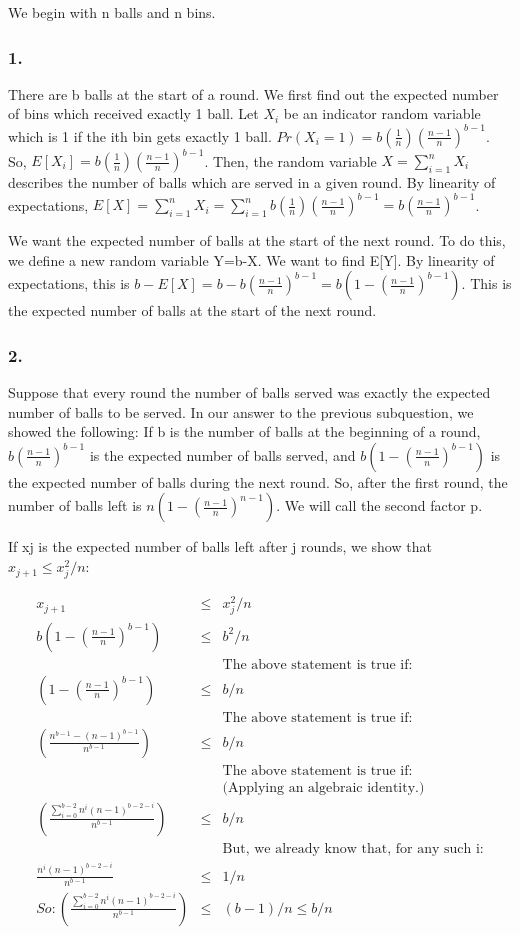 \documentclass[10pt]{article}
\begin{document}
We begin with n balls and n bins.

\subsubsection{1.}
There are b balls at the start of a round. We first find out the expected number of bins which received exactly 1 ball. Let $X_{i}$ be an indicator random variable which is 1 if the ith bin gets exactly 1 ball. $Pr(X_{i}=1)=b(\frac{1}{n})(\frac{n-1}{n})^{b-1}$. So, $E[X_{i}]=b(\frac{1}{n})(\frac{n-1}{n})^{b-1}$. Then, the random variable $X=\sum_{i=1}^{n} X_{i}$ describes the number of balls which are served in a given round. By linearity of expectations, $E[X]=\sum_{i=1}^{n}X_{i}=\sum_{i=1}^{n}b(\frac{1}{n})(\frac{n-1}{n})^{b-1}=b(\frac{n-1}{n})^{b-1}$.

We want the expected number of balls at the start of the next round. To do this, we define a new random variable Y=b-X. We want to find E[Y]. By linearity of expectations, this is $b-E[X] = b-b(\frac{n-1}{n})^{b-1}=b(1-(\frac{n-1}{n})^{b-1})$. This is the expected number of balls at the start of the next round.

\subsubsection{2.}
Suppose that every round the number of balls served was exactly the expected number of balls to be served. In our answer to the previous subquestion, we showed the following: If b is the number of balls at the beginning of a round, $b(\frac{n-1}{n})^{b-1}$ is the expected number of balls served, and $b(1-(\frac{n-1}{n})^{b-1})$ is the expected number of balls during the next round. So, after the first round, the number of balls left is $ n(1-(\frac{n-1}{n})^{n-1})$. We will call the second factor p.

If xj is the expected number of balls left after j rounds, we show that $x_{j+1}\leq x_{j}^{2}/n$:

\begin{eqnarray}
x_{j+1} &\leq& x_{j}^{2}/n\\
b(1-(\frac{n-1}{n})^{b-1}) &\leq& b^{2}/n \\
&&\text{The above statement is true if:}\\
(1-(\frac{n-1}{n})^{b-1}) &\leq& b/n \\
&&\text{The above statement is true if:}\\
(\frac{n^{b-1}-(n-1)^{b-1}}{n^{b-1}}) &\leq& b/n \\
&&\text{The above statement is true if:}\\
&&\text{(Applying an algebraic identity.)}\\
(\frac{\sum_{i=0}^{b-2}n^{i}(n-1)^{b-2-i}}{n^{b-1}}) &\leq& b/n \\
&&\text{But, we already know that, for any such i:}\\
\frac{n^{i}(n-1)^{b-2-i}}{n^{b-1}} &\leq& 1/n\\
So:(\frac{\sum_{i=0}^{b-2}n^{i}(n-1)^{b-2-i}}{n^{b-1}}) &\leq& (b-1)/n \leq b/n\\
\end{eqnarray}
\end{document}
